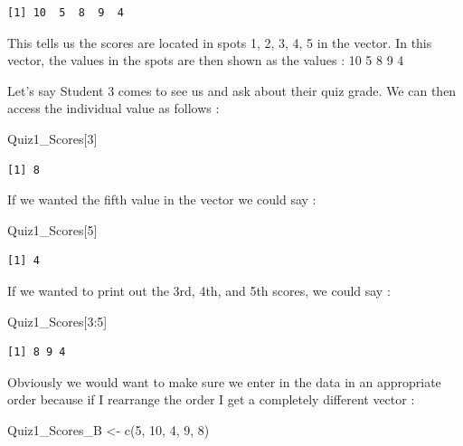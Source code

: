 \documentclass[
  letterpaper,
  DIV=11,
  numbers=noendperiod]{scrreprt}
\newenvironment{Shaded}{\begin{snugshade}}{\end{snugshade}}
\newcommand{\DecValTok}[1]{\textcolor[rgb]{0.68,0.00,0.00}{#1}}
\newcommand{\FunctionTok}[1]{\textcolor[rgb]{0.28,0.35,0.67}{#1}}
\newcommand{\NormalTok}[1]{\textcolor[rgb]{0.00,0.23,0.31}{#1}}
\newcommand{\OtherTok}[1]{\textcolor[rgb]{0.00,0.23,0.31}{#1}}
\newcommand{\SpecialCharTok}[1]{\textcolor[rgb]{0.37,0.37,0.37}{#1}}
\begin{document}
\begin{verbatim}
[1] 10  5  8  9  4
\end{verbatim}

This tells us the scores are located in spots 1, 2, 3, 4, 5 in the
vector. In this vector, the values in the spots are then shown as the
values : 10 5 8 9 4

Let's say Student 3 comes to see us and ask about their quiz grade. We
can then access the individual value as follows :

\begin{Shaded}
\begin{Highlighting}[]
\NormalTok{Quiz1\_Scores[}\DecValTok{3}\NormalTok{]}
\end{Highlighting}
\end{Shaded}

\begin{verbatim}
[1] 8
\end{verbatim}

If we wanted the fifth value in the vector we could say :

\begin{Shaded}
\begin{Highlighting}[]
\NormalTok{Quiz1\_Scores[}\DecValTok{5}\NormalTok{]}
\end{Highlighting}
\end{Shaded}

\begin{verbatim}
[1] 4
\end{verbatim}

If we wanted to print out the 3rd, 4th, and 5th scores, we could say :

\begin{Shaded}
\begin{Highlighting}[]
\NormalTok{Quiz1\_Scores[}\DecValTok{3}\SpecialCharTok{:}\DecValTok{5}\NormalTok{]}
\end{Highlighting}
\end{Shaded}

\begin{verbatim}
[1] 8 9 4
\end{verbatim}

Obviously we would want to make sure we enter in the data in an
appropriate order because if I rearrange the order I get a completely
different vector :

\begin{Shaded}
\begin{Highlighting}[]
\NormalTok{Quiz1\_Scores\_B }\OtherTok{\textless{}{-}} \FunctionTok{c}\NormalTok{(}\DecValTok{5}\NormalTok{, }\DecValTok{10}\NormalTok{, }\DecValTok{4}\NormalTok{, }\DecValTok{9}\NormalTok{, }\DecValTok{8}\NormalTok{)}
\end{Highlighting}
\end{Shaded}
\end{document}
